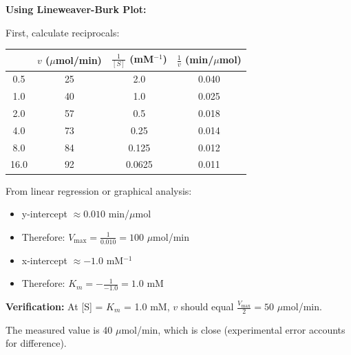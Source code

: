 \begin{solution}
\textbf{Using Lineweaver-Burk Plot:}

First, calculate reciprocals:
\begin{center}
\begin{tabular}{cccc}
\toprule
[S] (mM) & $v$ ($\mu$mol/min) & $\frac{1}{[S]}$ (mM$^{-1}$) & $\frac{1}{v}$ (min/$\mu$mol) \\
\midrule
0.5 & 25 & 2.0 & 0.040 \\
1.0 & 40 & 1.0 & 0.025 \\
2.0 & 57 & 0.5 & 0.018 \\
4.0 & 73 & 0.25 & 0.014 \\
8.0 & 84 & 0.125 & 0.012 \\
16.0 & 92 & 0.0625 & 0.011 \\
\bottomrule
\end{tabular}
\end{center}

From linear regression or graphical analysis:
\begin{itemize}
    \item y-intercept $\approx 0.010$ min/$\mu$mol
    \item Therefore: $V_{\max} = \frac{1}{0.010} = 100$ $\mu$mol/min
    \item x-intercept $\approx -1.0$ mM$^{-1}$
    \item Therefore: $K_m = -\frac{1}{-1.0} = 1.0$ mM
\end{itemize}

\textbf{Verification:} At [S] = $K_m$ = 1.0 mM, $v$ should equal $\frac{V_{\max}}{2} = 50$ $\mu$mol/min.

The measured value is 40 $\mu$mol/min, which is close (experimental error accounts for difference).
\end{solution}


